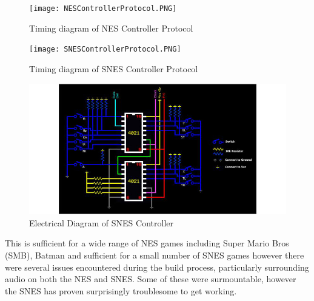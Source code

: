 \documentclass{article}
\begin{document}
\begin{figure}
    \texttt{[image: NESControllerProtocol.PNG]}
    \caption{Timing diagram of NES Controller Protocol}
    \label{fig:NESControllerTiming}
\end{figure}

\begin{figure}
    \texttt{[image: SNESControllerProtocol.PNG]}
    \caption{Timing diagram of SNES Controller Protocol}
    \label{fig:SNESControllerTiming}
\end{figure}


\begin{figure}[h]
   \includegraphics[width=\linewidth]{SNESController.jpg}
   \caption[]{ Electrical Diagram of SNES Controller\footnotemark}
   \label{fig:SNESController}
\end{figure}


This is sufficient for a wide range of NES games including Super Mario Bros (SMB), Batman and sufficient for a small number of SNES games however there were several issues encountered during the build process, particularly surrounding audio on both the NES and SNES.    Some of these were surmountable, however the SNES has proven surprisingly troublesome to get working.  
\end{document}
